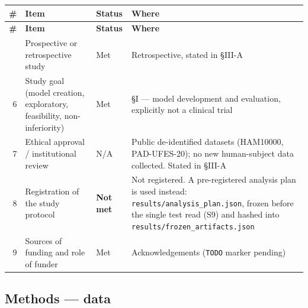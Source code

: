 \begin{longtable}{@{}rp{}lp{}@{}}
\toprule
\textbf{\#} & \textbf{Item} & \textbf{Status} & \textbf{Where} \\
\midrule
\endfirsthead
\toprule
\textbf{\#} & \textbf{Item} & \textbf{Status} & \textbf{Where} \\
\midrule
\endhead
\bottomrule
\endfoot
5 & Prospective or retrospective study & Met & Retrospective, stated in \S{}III-A \\
6 & Study goal (model creation, exploratory, feasibility, non-inferiority) & Met & \S{}I --- model development and evaluation, explicitly not a clinical trial \\
7 & Ethical approval / institutional review & N/A & Public de-identified datasets (HAM10000, PAD-UFES-20); no new human-subject data collected. Stated in \S{}III-A \\
8 & Registration of the study protocol & \textbf{Not met} & Not registered. A pre-registered analysis plan is used instead: \texttt{results/analysis\_plan.json}, frozen before the single test read (S9) and hashed into \texttt{results/frozen\_artifacts.json} \\
9 & Sources of funding and role of funder & Met & Acknowledgements (\texttt{TODO} marker pending) \\
\end{longtable}


\subsection*{Methods --- data}


